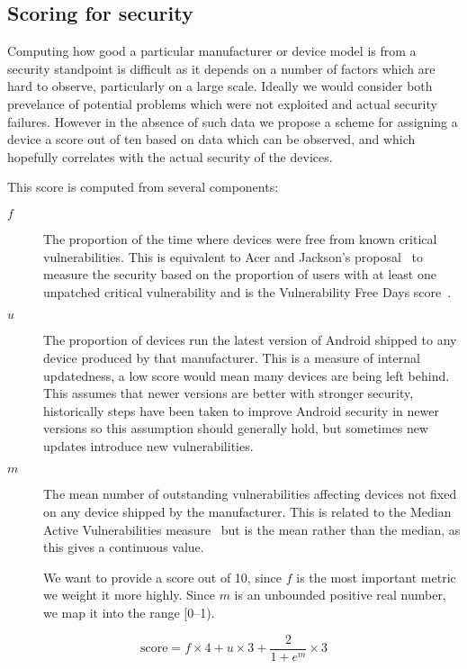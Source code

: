 \subsection{Scoring for security}
\label{sec:security_scoring}

Computing how good a particular manufacturer or device model is from a security standpoint is difficult as it depends on a number of factors which are hard to observe, particularly on a large scale.
Ideally we would consider both prevelance of potential problems which were not exploited and actual security failures.
However in the absence of such data we propose a scheme for assigning a device a score out of ten based on data which can be observed, and which hopefully correlates with the actual security of the devices.

This score is computed from several components:
\begin{description}
  \item[$f$] The proportion of the time where devices were free from known critical vulnerabilities. This is equivalent to Acer and Jackson's proposal~\cite{Acer2010} to measure the security based on the proportion of users with at least one unpatched critical vulnerability and is the Vulnerability Free Days score~\cite{Wright2014}.
  \item[$u$] The proportion of devices run the latest version of Android shipped to any device produced by that manufacturer. This is a measure of internal updatedness, a low score would mean many devices are being left behind.
  This assumes that newer versions are better with stronger security, historically steps have been taken to improve Android security in newer versions so this assumption should generally hold, but sometimes new updates introduce new vulnerabilities.
  \item[$m$] The mean number of outstanding vulnerabilities affecting devices not fixed on any device shipped by the manufacturer. This is related to the Median Active Vulnerabilities measure~\cite{Wright2014} but is the mean rather than the median, as this gives a continuous value.

We want to provide a score out of 10, since $f$ is the most important metric we weight it more highly.
Since $m$ is an unbounded positive real number, we map it into the range [0--1).
\end{description}
\begin{equation}
\mathrm{score} = f\times 4 + u \times 3 + \frac{2}{1+e^m} \times 3
\end{equation}

